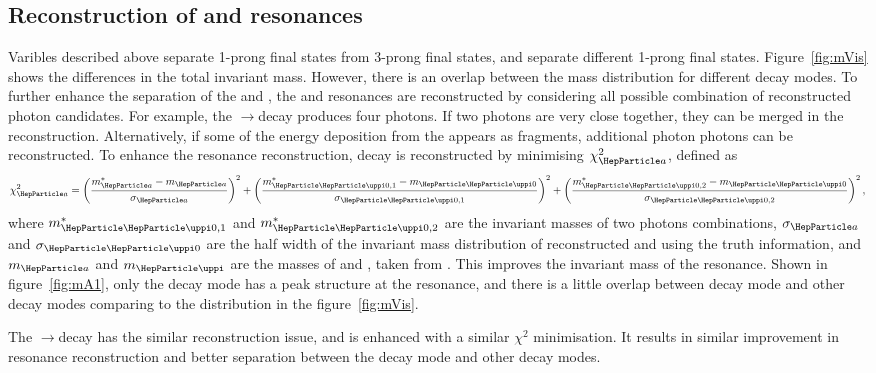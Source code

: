 \documentclass[a4paper,11pt]{article}
\newcommand{\decayRho}{\PGrP{\PGpm\PGpz}\PGnGt}
\newcommand{\decayAiPhoton}{\PaDoP{\PGpm\PGpz\PGpz}\PGnGt}
\newcommand{\AiPhotonDecay}{\PaDoP{1260}$\to$\PGpm\PGpz\PGpz}
\newcommand{\RhoDecay}{\PGrP{770}$\to$\PGpm\PGpz}
\begin{document}
\subsection{Reconstruction of \texorpdfstring{}{a1} and \texorpdfstring{}{$\rho$}  resonances}

Varibles described above separate 1-prong final states from 3-prong final states, and separate different 1-prong final states. Figure~\ref{fig:mVis} shows the differences in the total invariant mass. However, there is an overlap between the mass distribution for different decay modes. To further enhance the separation of the \decayAiPhoton and \decayRho, the  and  resonances are reconstructed by considering all possible combination of reconstructed photon candidates. For example, the \AiPhotonDecay decay produces four photons. If two photons are very close together, they can be merged in the reconstruction. Alternatively, if some of the energy deposition from the \PGpm appears as fragments, additional photon photons can be reconstructed. To enhance the resonance reconstruction, \decayAiPhoton decay is reconstructed by minimising $\chi_{\Pa}^{2}$, defined as
\begin{equation}
\label{eq:a1}
\chi_{\Pa}^{2} = {\left(\frac{m^*_{\Pa} -  m_{\Pa}}{\sigma_{\Pa}}\right)}^{2} + {\left(\frac{{m^*_{\PGpz,1}} -  m_{\PGpz}}{\sigma_{\PGpz,1}}\right)}^{2} + {\left(\frac{{m^*_{\PGpz,2}} -  m_{\PGpz}}{\sigma_{\PGpz,2}}\right)}^{2}  \,,
\end{equation}
where $m^*_{\PGpz,1}$ and $m^*_{\PGpz,2}$  are the invariant masses of two photons combinations, $\sigma_{\Pa}$ and $\sigma_{\PGpz}$ are the half width of the invariant mass distribution of reconstructed \Pa and \PGpz using the truth information, and $m_{\Pa}$ and $m_{\PGp}$ are the masses of \Pa and \PGpz, taken from \cite{Agashe:2014kda}. This improves the invariant mass of the  resonance. Shown in figure~\ref{fig:mA1}, only the \decayAiPhoton decay mode has a peak structure at the  resonance, and there is a little overlap between \decayAiPhoton decay mode and other decay modes comparing to the distribution in the figure~\ref{fig:mVis}.

The \RhoDecay decay has the similar reconstruction issue, and is enhanced with a similar $\chi^{2}$ minimisation. It results in similar improvement in  resonance reconstruction and better separation between  the \decayRho decay mode and other decay modes.


\end{document}
